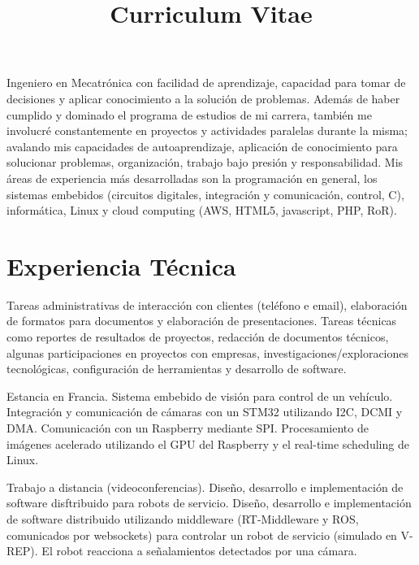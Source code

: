 \documentclass[11pt,a4paper,sans]{moderncv}	%
\title{Curriculum Vitae}
\begin{document}
\maketitle
Ingeniero en Mecatrónica con facilidad de aprendizaje, capacidad para tomar de decisiones y aplicar conocimiento a la solución de problemas. Además de haber cumplido y dominado el programa de estudios de mi carrera, también me involucré constantemente en proyectos y actividades paralelas durante la misma; avalando mis capacidades de autoaprendizaje, aplicación de conocimiento para solucionar problemas, organización, trabajo bajo presión y responsabilidad. Mis áreas de experiencia más desarrolladas son la programación en general, los sistemas embebidos (circuitos digitales, integración y comunicación, control, C), informática, Linux y cloud computing (AWS, HTML5, javascript, PHP, RoR).

\section{Experiencia Técnica}
{Tareas administrativas de interacción con clientes (teléfono e email), elaboración de formatos para documentos y elaboración de presentaciones. Tareas técnicas como reportes de resultados de proyectos, redacción de documentos técnicos, algunas participaciones en proyectos con empresas, investigaciones/exploraciones tecnológicas, configuración de herramientas y desarrollo de software.}

{Estancia en Francia. Sistema embebido de visión para control de un vehículo. Integración y comunicación de cámaras con un STM32 utilizando I2C, DCMI y DMA. Comunicación con un Raspberry mediante SPI. Procesamiento de imágenes acelerado utilizando el GPU del Raspberry y el real-time scheduling de Linux.}

{Trabajo a distancia (videoconferencias). Diseño, desarrollo e implementación de software disftribuido para robots de servicio. Diseño, desarrollo e implementación de software distribuido utilizando middleware (RT-Middleware y ROS, comunicados por websockets) para controlar un robot de servicio (simulado en V-REP). El robot reacciona a señalamientos detectados por una cámara.}
\end{document}

